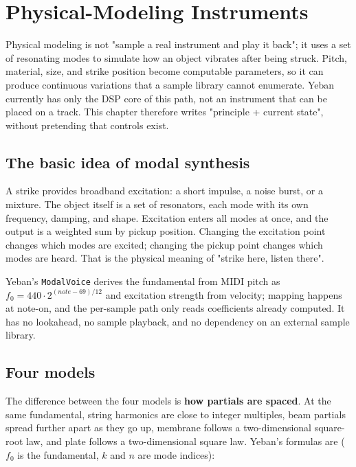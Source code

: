 \chapter{Physical-Modeling Instruments}
\label{chap:physical-modeling}


Physical modeling is not "sample a real instrument and play it back"; it uses a set of resonating modes to simulate how an object vibrates after being struck. Pitch, material, size, and strike position become computable parameters, so it can produce continuous variations that a sample library cannot enumerate. Yeban currently has only the DSP core of this path, not an instrument that can be placed on a track. This chapter therefore writes "principle + current state", without pretending that controls exist.

\section{The basic idea of modal synthesis}

A strike provides broadband excitation: a short impulse, a noise burst, or a mixture. The object itself is a set of resonators, each mode with its own frequency, damping, and shape. Excitation enters all modes at once, and the output is a weighted sum by pickup position. Changing the excitation point changes which modes are excited; changing the pickup point changes which modes are heard. That is the physical meaning of "strike here, listen there".

Yeban's \texttt{ModalVoice} derives the fundamental from MIDI pitch as $f_0 = 440\cdot2^{(note-69)/12}$ and excitation strength from velocity; mapping happens at note-on, and the per-sample path only reads coefficients already computed. It has no lookahead, no sample playback, and no dependency on an external sample library.

\section{Four models}

The difference between the four models is \textbf{how partials are spaced}. At the same fundamental, string harmonics are close to integer multiples, beam partials spread further apart as they go up, membrane follows a two-dimensional square-root law, and plate follows a two-dimensional square law. Yeban's formulas are ($f_0$ is the fundamental, $k$ and $n$ are mode indices):


